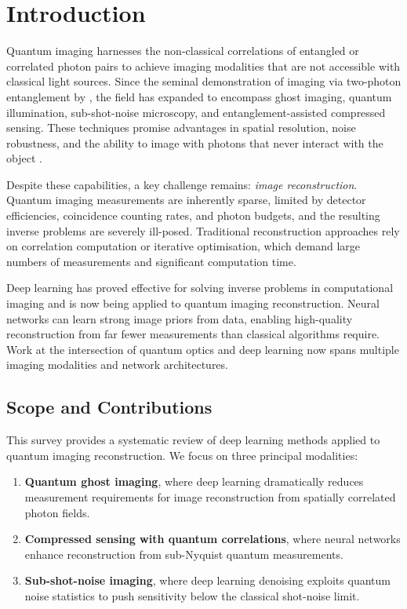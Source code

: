 \section{Introduction}
\label{sec:introduction}

Quantum imaging harnesses the non-classical correlations of entangled or correlated photon pairs to achieve imaging modalities that are not accessible with classical light sources. Since the seminal demonstration of imaging via two-photon entanglement by \citet{pittman1995}, the field has expanded to encompass ghost imaging, quantum illumination, sub-shot-noise microscopy, and entanglement-assisted compressed sensing. These techniques promise advantages in spatial resolution, noise robustness, and the ability to image with photons that never interact with the object \citep{erkmen2010}.

Despite these capabilities, a key challenge remains: \emph{image reconstruction}. Quantum imaging measurements are inherently sparse, limited by detector efficiencies, coincidence counting rates, and photon budgets, and the resulting inverse problems are severely ill-posed. Traditional reconstruction approaches rely on correlation computation or iterative optimisation, which demand large numbers of measurements and significant computation time.

Deep learning has proved effective for solving inverse problems in computational imaging \citep{barbastathis2019, lecun2015} and is now being applied to quantum imaging reconstruction. Neural networks can learn strong image priors from data, enabling high-quality reconstruction from far fewer measurements than classical algorithms require. Work at the intersection of quantum optics and deep learning now spans multiple imaging modalities and network architectures.

\subsection{Scope and Contributions}

This survey provides a systematic review of deep learning methods applied to quantum imaging reconstruction. We focus on three principal modalities:

\begin{enumerate}[label=(\roman*)]
    \item \textbf{Quantum ghost imaging}, where deep learning dramatically reduces measurement requirements for image reconstruction from spatially correlated photon fields.
    \item \textbf{Compressed sensing with quantum correlations}, where neural networks enhance reconstruction from sub-Nyquist quantum measurements.
    \item \textbf{Sub-shot-noise imaging}, where deep learning denoising exploits quantum noise statistics to push sensitivity below the classical shot-noise limit.
\end{enumerate}

